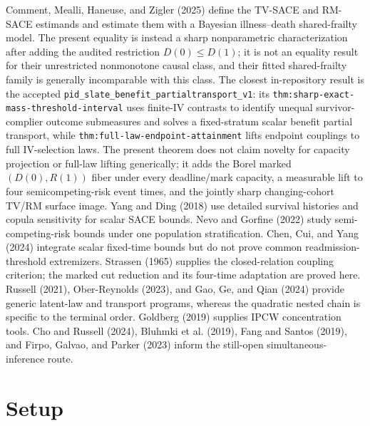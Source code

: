 \documentclass{article}
\begin{document}
Comment, Mealli, Haneuse, and Zigler (2025) define the TV-SACE and RM-SACE estimands and estimate them with a Bayesian illness--death shared-frailty model.  The present equality is instead a sharp nonparametric characterization after adding the audited restriction \(D(0)\le D(1)\); it is not an equality result for their unrestricted nonmonotone causal class, and their fitted shared-frailty family is generally incomparable with this class.  The closest in-repository result is the accepted \texttt{pid\_slate\_benefit\_partialtransport\_v1}: its \texttt{thm:sharp-exact-mass-threshold-interval} uses finite-IV contrasts to identify unequal survivor-complier outcome submeasures and solves a fixed-stratum scalar benefit partial transport, while \texttt{thm:full-law-endpoint-attainment} lifts endpoint couplings to full IV-selection laws.  The present theorem does not claim novelty for capacity projection or full-law lifting generically; it adds the Borel marked \( (D(0),R(1)) \) fiber under every deadline/mark capacity, a measurable lift to four semicompeting-risk event times, and the jointly sharp changing-cohort TV/RM surface image.  Yang and Ding (2018) use detailed survival histories and copula sensitivity for scalar SACE bounds.  Nevo and Gorfine (2022) study semi-competing-risk bounds under one population stratification.  Chen, Cui, and Yang (2024) integrate scalar fixed-time bounds but do not prove common readmission-threshold extremizers.  Strassen (1965) supplies the closed-relation coupling criterion; the marked cut reduction and its four-time adaptation are proved here.  Russell (2021), Ober-Reynolds (2023), and Gao, Ge, and Qian (2024) provide generic latent-law and transport programs, whereas the quadratic nested chain is specific to the terminal order.  Goldberg (2019) supplies IPCW concentration tools.  Cho and Russell (2024), Bluhmki et al. (2019), Fang and Santos (2019), and Firpo, Galvao, and Parker (2023) inform the still-open simultaneous-inference route.

\section{Setup}
\end{document}
